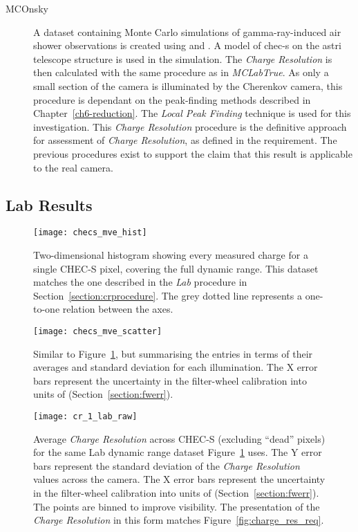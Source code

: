 \begin{description}
\item [MCOnsky] A dataset containing Monte Carlo simulations of gamma-ray-induced air shower observations is created using  and . A model of \gls{chec-s} on the \gls{astri} telescope structure is used in the simulation. The \textit{Charge Resolution} is then calculated with the same procedure as in \textit{MCLabTrue}. As only a small section of the camera is illuminated by the Cherenkov camera, this procedure is dependant on the peak-finding methods described in Chapter~\ref{ch6-reduction}. The \textit{Local Peak Finding} technique is used for this investigation. This \textit{Charge Resolution} procedure is the definitive approach for assessment of \textit{Charge Resolution}, as defined in the requirement. The previous procedures exist to support the claim that this result is applicable to the real camera.
\end{description}

\subsection{Lab Results}

\begin{figure}
	\centering
    \texttt{[image: checs\_mve\_hist]} 
	\caption[CHEC-S measured charge versus average expected charge.]{Two-dimensional histogram showing every measured charge for a single CHEC-S pixel, covering the full dynamic range. This dataset matches the one described in the \textit{Lab} procedure in Section~\ref{section:crprocedure}. The grey dotted line represents a one-to-one relation between the axes.}
	\label{fig:checs_mve_hist}
\end{figure}

\begin{figure}
	\centering
    \texttt{[image: checs\_mve\_scatter]} 
	\caption[CHEC-S average measured charge versus average expected charge.]{Similar to Figure~\ref{fig:checs_mve_hist}, but summarising the entries in terms of their averages and standard deviation for each illumination. The X error bars represent the uncertainty in the filter-wheel calibration into units of \si{\pe} (Section~\ref{section:fwerr}).}
	\label{fig:checs_mve_scatter}
\end{figure}

\begin{figure}
	\centering
    \texttt{[image: cr\_1\_lab\_raw]} 
	\caption[\textit{Charge Resolution} of the Lab dataset in default units.]{Average \textit{Charge Resolution} across CHEC-S (excluding ``dead'' pixels) for the same Lab dynamic range dataset Figure~\ref{fig:checs_mve_hist} uses. The Y error bars represent the standard deviation of the \textit{Charge Resolution} values across the camera. The X error bars represent the uncertainty in the filter-wheel calibration into units of \si{\pe} (Section~\ref{section:fwerr}). The points are binned to improve visibility. The presentation of the \textit{Charge Resolution} in this form matches Figure~\ref{fig:charge_res_req}.}
	\label{fig:cr_1_lab_raw}
\end{figure}

